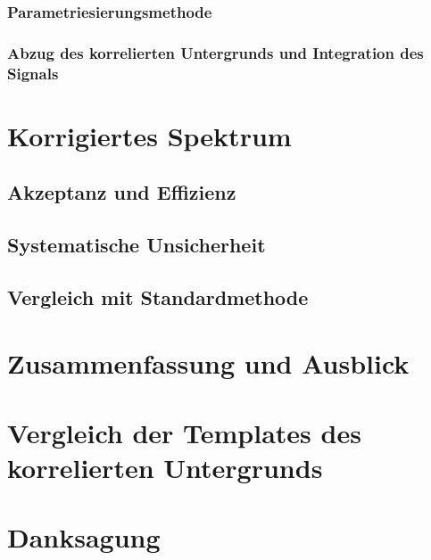 \documentclass[a4paper,11pt,twoside]{report}
\renewcommand{\,}{,\!} %
\begin{document}
\subsection{Parametriesierungsmethode} \label{s3s5s3}


\subsection{Abzug des korrelierten Untergrunds und Integration des Signals} \label{s3s5s4}


\chapter{Korrigiertes Spektrum} \label{s4}

\section{Akzeptanz und Effizienz} \label{s4s1}


\section{Systematische Unsicherheit} \label{s4s2}


\section{Vergleich mit Standardmethode} \label{s4s3}


\chapter{Zusammenfassung und Ausblick} \label{s5}

\clearpage

\appendix
\chapter{Vergleich der Templates des korrelierten Untergrunds} \label{Appendix:A}

\newpage
 

\clearpage
\chapter{Danksagung} \label{Appendix:B}

\clearpage
\end{document}
